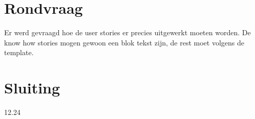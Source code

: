 \documentclass{article}
\begin{document}
\section{Rondvraag}
Er werd gevraagd hoe de user stories er precies uitgewerkt moeten worden. De know how stories mogen gewoon een blok tekst zijn, de rest moet volgens de template.

\section{Sluiting}
12.24
\end{document}
